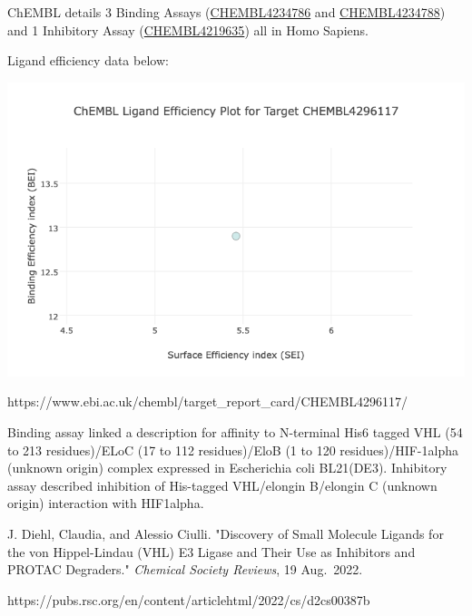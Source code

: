 \documentclass[
  letterpaper,
  DIV=11,
  numbers=noendperiod]{scrartcl}
\begin{document}
ChEMBL details 3 Binding Assays
(\href{https://www.ebi.ac.uk/chembl/assay_report_card/CHEMBL4234786}{CHEMBL4234786}
and
\href{https://www.ebi.ac.uk/chembl/assay_report_card/CHEMBL4234788}{CHEMBL4234788})
and 1 Inhibitory Assay
(\href{https://www.ebi.ac.uk/chembl/assay_report_card/CHEMBL4219635}{CHEMBL4219635})
all in Homo Sapiens.

Ligand efficiency data below:

\includegraphics{images/newplot.png}

https://www.ebi.ac.uk/chembl/target\_report\_card/CHEMBL4296117/

Binding assay linked a description for affinity to N-terminal His6
tagged VHL (54 to 213 residues)/ELoC (17 to 112 residues)/EloB (1 to 120
residues)/HIF-1alpha (unknown origin) complex expressed in Escherichia
coli BL21(DE3). Inhibitory assay described inhibition of His-tagged
VHL/elongin B/elongin C (unknown origin) interaction with HIF1alpha.

J. Diehl, Claudia, and Alessio Ciulli. "Discovery of Small Molecule
Ligands for the von Hippel-Lindau (VHL) E3 Ligase and Their Use as
Inhibitors and PROTAC Degraders." \emph{Chemical Society Reviews}, 19
Aug.~2022.

https://pubs.rsc.org/en/content/articlehtml/2022/cs/d2cs00387b
\end{document}

